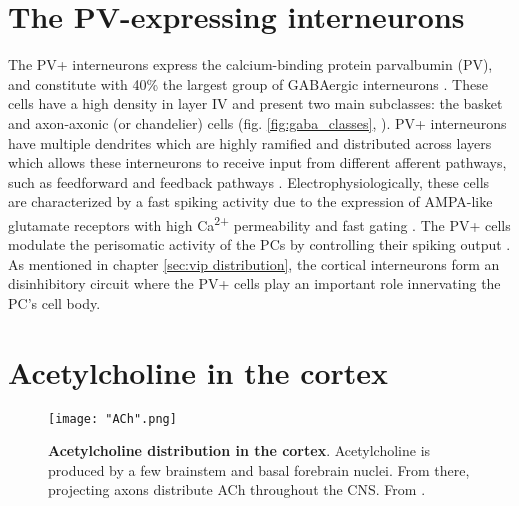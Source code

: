 \section{The PV-expressing interneurons}
\label{sec:pv}
The PV+ interneurons express the calcium-binding protein parvalbumin (PV),  and constitute with 40\% the largest group of GABAergic interneurons \citep{Celio1986}. These cells have a high density in layer IV and present two main subclasses: the basket and axon-axonic (or chandelier) cells (fig. \ref{fig:gaba_classes}, \cite{Markram2004}). PV+ interneurons have multiple dendrites which are highly ramified and distributed across layers which allows these interneurons to receive input from different afferent pathways, such as feedforward and feedback pathways \citep{Hu2014}. Electrophysiologically, these cells are characterized by a fast spiking activity due to the expression of AMPA-like glutamate receptors with high Ca\textsuperscript{2+} permeability and fast gating \citep{Kawaguchi1987,Geiger1995}. The PV+ cells modulate the perisomatic activity of the PCs by controlling their spiking output \citep{Tremblay2017,Wang2017}. As mentioned in chapter \ref{sec:vip distribution}, the cortical interneurons form an disinhibitory circuit where the PV+ cells play an important role innervating the PC's cell body.

\section{Acetylcholine in the cortex}
\label{sec:chat}

 \begin{wrapfigure}[14]{r}{0pt}
	\centering
	\texttt{[image: "ACh".png]}
	\caption[ACh distribution in the cortex]{\textbf{Acetylcholine distribution in the cortex}. Acetylcholine is produced by a few brainstem and basal forebrain nuclei. From there, projecting axons distribute ACh throughout the CNS. From \cite{Thiele2013}.}
	\label{fig:ach}	
\end{wrapfigure}

